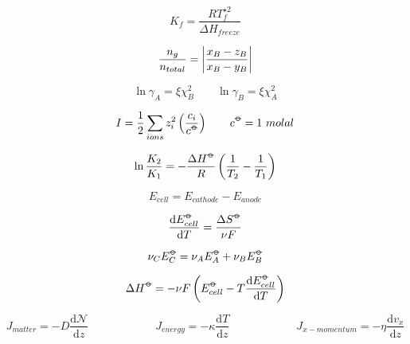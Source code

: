 \documentclass[12pt, letterpaper]{memoir}
\begin{document}
\begin{minipage}[t]{0.5\linewidth}
	\begin{equation*}
		K_f=\frac{RT^{\star 2}_f}{\Delta H_{freeze}}
	\end{equation*}

	\begin{equation*}
		\frac{n_g}{n_{total}}=\left| \frac{x_B-z_B}{x_B-y_B} \right|
	\end{equation*}

	\begin{equation*}
		\ln\gamma_A=\xi\chi_B^2 \hspace{2em} \ln\gamma_B=\xi\chi_A^2
	\end{equation*}

	\begin{equation*}
		I = \frac{1}{2}\sum\limits_{ions}z_i^2\left(\frac{c_i}{c^{\std}}\right) \hspace{2em} c^{\std}=1~molal
	\end{equation*}

	\begin{equation*}
		\ln\frac{K_2}{K_1} = -\frac{\Delta H^{\std}}{R}\left(\frac{1}{T_2}-\frac{1}{T_1}\right)
	\end{equation*}

	\begin{equation*}
		E_{cell}=E_{cathode}-E_{anode}
	\end{equation*}

	\begin{equation*}
		\frac{\mathrm{d}E^{\std}_{cell}}{\mathrm{d}T}=\frac{\Delta S^{\std}}{\nu F}
	\end{equation*}

	\begin{equation*}
		\nu_CE^{\std}_C = \nu_AE^{\std}_A + \nu_BE^{\std}_B
	\end{equation*}

	\begin{equation*}
		\Delta H^{\std}=-\nu F\left(E^{\std}_{cell}-T\frac{\mathrm{d}E^{\std}_{cell}}{\mathrm{d}T}\right)
	\end{equation*}
\end{minipage}

\begin{equation*}
	J_{matter}=-D\frac{\mathrm{d}\mathcal{N}}{\mathrm{d}z} \hspace{6em} J_{energy}=-\kappa\frac{\mathrm{d}T}{\mathrm{d}z} \hspace{6em} J_{x-momentum}=-\eta\frac{\mathrm{d}v_x}{\mathrm{d}z}
\end{equation*}
\end{document}
